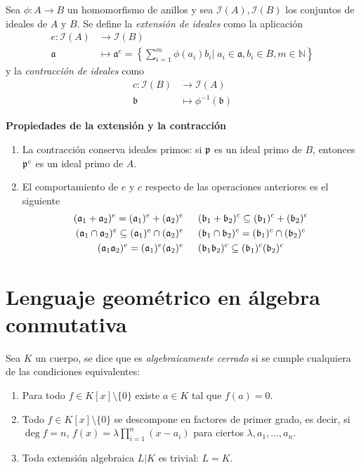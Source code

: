 \documentclass[./main.tex]{subfiles}
\begin{document}
\begin{definition}
Sea $\phi:A\to B$ un homomorfismo de anillos y sea $\mathcal I(A), \mathcal I(B)$ los conjuntos de ideales de $A$ y $B$. Se define la \emph{extensión de ideales} como la aplicación
\begin{align*}
    e:\mathcal I(A) &\to \mathcal I(B) \\
    \mathfrak a &\mapsto \mathfrak a^e =\left \{\sum_{i=1}^m \phi(a_i)b_i \bigg\vert \; a_i \in \mathfrak a, b_i \in B, m\in \mathbb N \right \}
\end{align*}
y la \emph{contracción de ideales} como
\begin{align*}
    c:\mathcal I(B) &\to \mathcal I(A) \\
    \mathfrak{b} &\mapsto \phi^{-1}(\mathfrak b)
\end{align*}
\end{definition}

\begin{remark} \textbf{Propiedades de la extensión y la contracción}

\begin{enumerate}
    \item La contracción conserva ideales primos: si $\mathfrak{p}$ es un ideal primo de $B$, entonces $\mathfrak{p}^c$ es un ideal primo de $A$.
    \item El comportamiento de $e$ y $c$ respecto de las operaciones anteriores es el siguiente\begin{align*}
        (\mathfrak{a}_1+\mathfrak{a}_2)^e=(\mathfrak{a}_1)^e+(\mathfrak{a}_2)^e\hspace{15pt}& (\mathfrak{b}_1+\mathfrak{b}_2)^c\subseteq(\mathfrak{b}_1)^c+(\mathfrak{b}_2)^c\\
        (\mathfrak{a}_1\cap\mathfrak{a}_2)^e\subseteq(\mathfrak{a}_1)^e\cap(\mathfrak{a}_2)^e\hspace{15pt}&(\mathfrak{b}_1\cap\mathfrak{b}_2)^c=(\mathfrak{b}_1)^c\cap(\mathfrak{b}_2)^c\\
        (\mathfrak{a}_1\mathfrak{a}_2)^e=(\mathfrak{a}_1)^e(\mathfrak{a}_2)^e\hspace{15pt}& (\mathfrak{b}_1\mathfrak{b}_2)^c\subseteq(\mathfrak{b}_1)^c(\mathfrak{b}_2)^c
    \end{align*}
\end{enumerate}
\end{remark}

\section{Lenguaje geométrico en álgebra conmutativa}

\begin{definition}
Sea $K$ un cuerpo, se dice que es \emph{algebraicamente cerrado} si se cumple cualquiera de las condiciones equivalentes:
\begin{enumerate}
    \item Para todo $f\in K[x]\setminus\{0\}$ existe $a\in K$ tal que $f(a)=0$.
    \item Todo $f\in K[x]\setminus\{0\}$ se descompone en factores de primer grado, es decir, si $\deg f = n$, $f(x) =\lambda \prod_{i=1}^n (x-a_i)$ para ciertos $\lambda, a_1, \dots, a_n$.
    \item Toda extensión algebraica $L\vert K$ es trivial: $L = K$.
\end{enumerate}
\end{definition}
\end{document}
